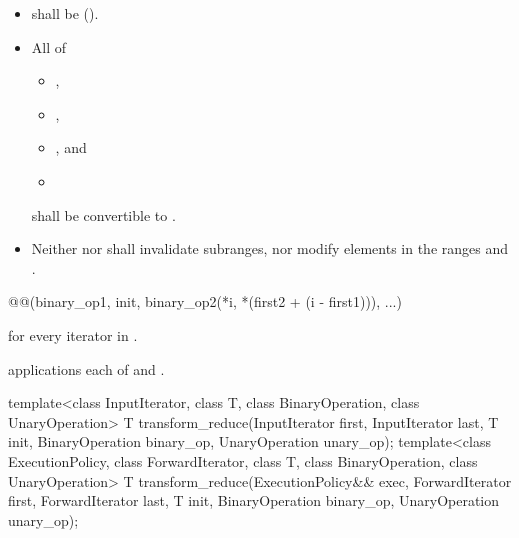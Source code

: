 \begin{itemdescr}
\pnum
\requires
\begin{itemize}
\item
   shall be  ().
\item
  All of
  \begin{itemize}
  \item {},
  \item {},
  \item {}, and
  \item {}
  \end{itemize}
  shall be convertible to .
\item
  Neither  nor 
  shall invalidate subranges, nor modify elements in the ranges
   and .
\end{itemize}

\pnum
\returns
\begin{codeblock}
@@(binary_op1, init, binary_op2(*i, *(first2 + (i - first1))), ...)
\end{codeblock}
for every iterator  in .

\pnum
\complexity
{} applications each
of  and .
\end{itemdescr}

%
\begin{itemdecl}
template<class InputIterator, class T,
         class BinaryOperation, class UnaryOperation>
  T transform_reduce(InputIterator first, InputIterator last, T init,
                     BinaryOperation binary_op, UnaryOperation unary_op);
template<class ExecutionPolicy,
         class ForwardIterator, class T,
         class BinaryOperation, class UnaryOperation>
  T transform_reduce(ExecutionPolicy&& exec,
                     ForwardIterator first, ForwardIterator last,
                     T init, BinaryOperation binary_op, UnaryOperation unary_op);
\end{itemdecl}

